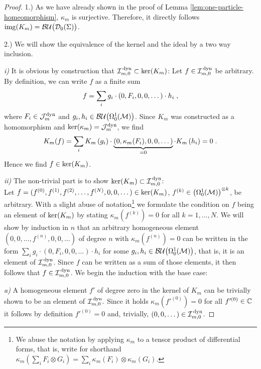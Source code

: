 \begin{proof}
1.) As we have already shown in the proof of Lemma \ref{lem:one-particle-homeomorphism}, $\kappa_m$ is surjective. Therefore, it directly follows $\mathrm{img}{}(K_m) = \mathcal{BU}\big(\mathcal{D}_{0}(\Sigma)\big) $.\par
2.) We will show the equivalence of the kernel and the ideal by a two way inclusion.\par
\emph{i)} It is obvious by construction that $\mathcal{I}_{m,0}^\text{\,dyn} \subset \textrm{ker}{\left(K_m\right)} $:
Let $f \in \mathcal{I}_{m,0}^\text{\,dyn}$ be arbitrary. By definition, we can write $f$ as a finite sum
\begin{align}
f = \sum\limits_i  g_{i} \cdot \left(0,F_i,0,0,\dots \right) \cdot h_{i} \;,
\end{align}
where $F_i \in \mathcal{J}_m^\text{dyn}$ and $g_i, h_i \in {\mathcal{BU}\big(\Omega^1_0(\ensuremath{\mathcal{M}})\big)}$. Since $K_m$ was constructed as a homomorphism and $\textrm{ker}{\left(\kappa_m\right)}  = \mathcal{J}_m^\text{dyn}$, we find
\begin{align}
K_m(f)
= \sum\limits_i  K_m\left(g_{i}\right) \cdot \underbrace{\left(0,\kappa_m(F_i),0,0,\dots \right)}_{=0} \cdot K_m\left(h_{i}\right)
= 0 \;.
\end{align}
Hence we find $f \in \textrm{ker}{\left(K_m\right)}$. \par
%
%
%
\emph{ii)} The non-trivial part is to show $\textrm{ker}{\left(K_m\right)} \subset \mathcal{I}_{m,0}^\text{\,dyn}$:\\
Let $f = (f^{(0)}, f^{(1)}, f^{(2)}, \dots , f^{(N)} , 0 , 0 ,\dots) \in \textrm{ker}{\left(K_m\right)}$, $f^{(k)} \in \left(\Omega^1_0(\mathcal{M})\right)^{\otimes k}$, be arbitrary.
With a slight abuse of notation\footnote{We abuse the notation by applying $\kappa_m$ to a tensor product of differential forms, that is, write for shorthand $\kappa_m(\sum_i F_i \otimes G_i) =\sum_i \kappa_m(F_i) \otimes \kappa_m(G_i)$.} we formulate the condition on $f$ being an element of $\textrm{ker}{\left(K_m\right)}$ by stating $\kappa_m\left(f^{(k)}\right)  = 0$ for all $k=1,\dots,N$.
We will show by induction in $n$ that an arbitrary homogeneous element $(0,0, \dots , f^{(n)} , 0 ,0, \dots)$ of degree $n$ with $\kappa_m\left(f^{(n)}\right)  = 0$ can be written in the form $\sum_i  g_{i} \cdot \left(0,F_i,0,0,\dots \right) \cdot h_{i}$ for some $g_{i}, h_{i} \in {\mathcal{BU}\big(\Omega^1_0(\ensuremath{\mathcal{M}})\big)}$, that is, it is an element of $\mathcal{I}_{m,0}^\text{\,dyn}$. Since $f$ can be written as a sum of those elements, it then follows that $f \in \mathcal{I}_{m,0}^\text{\,dyn}$.
%
%
%
We begin the induction with the base case:\par
\emph{a)} A homogeneous element $f'$ of degree zero in the kernel of $K_m$ can be trivially shown to be an element of $\mathcal{I}_{m,0}^\text{\,dyn}.$ Since it holds $\kappa_m(f'^{(0)}) = 0$ for all $f'^{(0)} \in \mathbb{C}$ it follows by definition $f'^{(0)} = 0$ and, trivially, $(0,0,\dots) \in \mathcal{I}_{m,0}^\text{\,dyn}$.\par

\end{proof}
